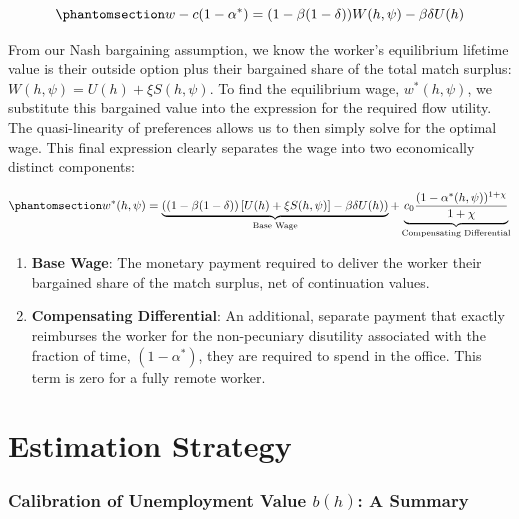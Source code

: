 \documentclass[
  11pt,
  letterpaper,
  DIV=11,
  numbers=noendperiod]{scrartcl}
\providecommand{\tightlist}{%
  \setlength{\itemsep}{0pt}\setlength{\parskip}{0pt}}\usepackage{longtable,booktabs,array}
\begin{document}
\begin{equation}\phantomsection\label{eq-wage-equation}{ w - c(1-\alpha^*) = (1 - \beta(1-\delta))W(h,\psi) - \beta\delta U(h) }\end{equation}

From our Nash bargaining assumption, we know the worker's equilibrium
lifetime value is their outside option plus their bargained share of the
total match surplus: \(W(h, \psi) = U(h) + \xi S(h, \psi)\). To find the
equilibrium wage, \(w^*(h, \psi)\), we substitute this bargained value
into the expression for the required flow utility. The quasi-linearity
of preferences allows us to then simply solve for the optimal wage. This
final expression clearly separates the wage into two economically
distinct components:

\begin{equation}\phantomsection\label{eq-wage-solution}{ w^*(h, \psi) = \underbrace{\left( (1 - \beta(1-\delta))\left[ U(h) + \xi S(h, \psi) \right] - \beta\delta U(h) \right)}_{\text{Base Wage}} + \underbrace{c_0 \frac{(1-\alpha^*(h, \psi))^{1+\chi}}{1+\chi}}_{\text{Compensating Differential}} }\end{equation}

\begin{enumerate}
\def\labelenumi{\arabic{enumi}.}
\tightlist
\item
  \textbf{Base Wage}: The monetary payment required to deliver the
  worker their bargained share of the match surplus, net of continuation
  values.
\item
  \textbf{Compensating Differential}: An additional, separate payment
  that exactly reimburses the worker for the non-pecuniary disutility
  associated with the fraction of time, \((1-\alpha^*)\), they are
  required to spend in the office. This term is zero for a fully remote
  worker.
\end{enumerate}

\section{Estimation Strategy}\label{estimation-strategy}

\subsubsection{\texorpdfstring{\textbf{Calibration of Unemployment Value
\(b(h)\): A
Summary}}{Calibration of Unemployment Value b(h): A Summary}}\label{calibration-of-unemployment-value-bh-a-summary}
\end{document}
